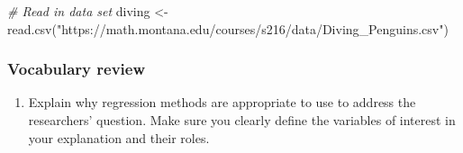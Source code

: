 \documentclass[
]{report}
\newenvironment{Shaded}{\begin{snugshade}}{\end{snugshade}}
\newcommand{\CommentTok}[1]{\textcolor[rgb]{0.56,0.35,0.01}{\textit{#1}}}
\newcommand{\FunctionTok}[1]{\textcolor[rgb]{0.00,0.00,0.00}{#1}}
\newcommand{\NormalTok}[1]{#1}
\newcommand{\OtherTok}[1]{\textcolor[rgb]{0.56,0.35,0.01}{#1}}
\newcommand{\StringTok}[1]{\textcolor[rgb]{0.31,0.60,0.02}{#1}}
\providecommand{\tightlist}{%
  \setlength{\itemsep}{0pt}\setlength{\parskip}{0pt}}
\begin{document}
\begin{Shaded}
\begin{Highlighting}[]
\CommentTok{\# Read in data set}
\NormalTok{diving }\OtherTok{\textless{}{-}} \FunctionTok{read.csv}\NormalTok{(}\StringTok{"https://math.montana.edu/courses/s216/data/Diving\_Penguins.csv"}\NormalTok{)}
\end{Highlighting}
\end{Shaded}

\hypertarget{vocabulary-review-3}{%
\subsubsection*{Vocabulary review}\label{vocabulary-review-3}}

\begin{enumerate}
\def\labelenumi{\arabic{enumi}.}
\tightlist
\item
  Explain why regression methods are appropriate to use to address the researchers' question. Make sure you clearly define the variables of interest in your explanation and their roles.
\end{enumerate}

\vspace{.5in}
\end{document}
